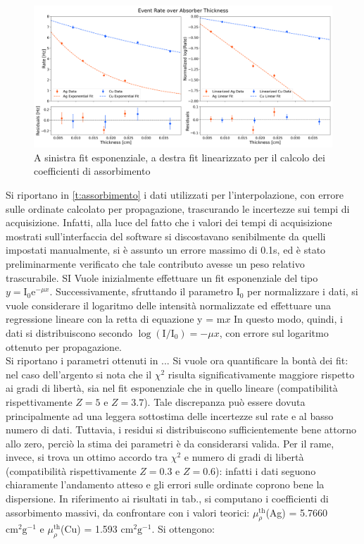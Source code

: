 \documentclass[twocolumn,10pt]{asme2ej}
\begin{document}
\begin{figure}[t]
    \centering
    \includegraphics[width=\textwidth]{../Plots/attenuation_coeff.png}
   \caption{A sinistra fit esponenziale, a destra fit linearizzato per il calcolo dei coefficienti di assorbimento}
    \label{i:attenuation}
\end{figure}

Si riportano in \autoref{t:assorbimento} i dati utilizzati per l'interpolazione, con errore sulle ordinate calcolato per 
propagazione, trascurando le incertezze sui tempi di acquisizione. Infatti, alla luce del fatto che i valori dei tempi di
acquisizione mostrati sull'interfaccia del software si discostavano senibilmente da quelli impostati manualmente, si è 
assunto un errore massimo di 0.1\si{\second}, ed è stato preliminarmente verificato che tale contributo avesse un peso 
relativo trascurabile. SI Vuole inizialmente effettuare un fit esponenziale del tipo $y = \text{I}_0 \text{e}^{-\mu x }$. 
Successivamente, sfruttando il parametro $\text{I}_0 $ per normalizzare i dati, si vuole considerare il logaritmo delle 
intensità normalizzate ed effettuare una regressione lineare con la retta  di equazione y = m$x$  In questo modo, quindi, 
i dati si distribuiscono secondo $\log(\text{I}/\text{I}_0)=-\mu x$, con errore sul logaritmo ottenuto per propagazione. \\
Si riportano i parametri ottenuti in ... Si vuole ora quantificare la bontà dei fit: nel caso dell'argento si nota che 
il $\chi^2$ risulta significativamente maggiore rispetto ai gradi di libertà, sia nel fit esponenziale che in quello lineare
(compatibilità rispettivamente $Z=5$ e $Z=3.7$). Tale discrepanza può essere dovuta principalmente ad una leggera 
sottostima delle incertezze sul rate e al basso numero di dati. Tuttavia, i residui si distribuiscono sufficientemente bene
attorno allo zero, perciò la stima dei parametri è da considerarsi valida. Per il rame, invece, si trova un ottimo accordo tra
$\chi^2$ e numero di gradi di libertà (compatibilità rispettivamente $Z=0.3$ e $Z=0.6$): infatti i dati seguono chiaramente
l'andamento atteso e gli errori sulle ordinate coprono bene la dispersione. 
\indent In riferimento ai risultati in tab., si computano i coefficienti di assorbimento massivi, da confrontare con i valori 
teorici: $\mu_{\rho}^{\text{th}}$(Ag) = 5.7660 $\si{\centi\metre^2\gram^{-1}}$ e
 $\mu_{\rho}^{\text{th}}$(Cu) = 1.593 $\si{\centi\metre^2\gram^{-1}}$. Si ottengono:
\end{document}
